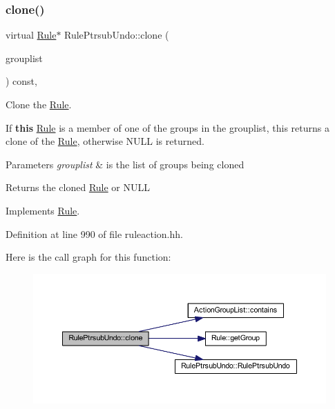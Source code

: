 \subsubsection{\texorpdfstring{clone()}{clone()}}
{\footnotesize\ttfamily virtual \mbox{\hyperlink{class_rule}{Rule}}$\ast$ Rule\+Ptrsub\+Undo\+::clone (\begin{DoxyParamCaption}\item[{const \mbox{\hyperlink{class_action_group_list}{Action\+Group\+List}} \&}]{grouplist }\end{DoxyParamCaption}) const\hspace{0.3cm}{\ttfamily [inline]}, {\ttfamily [virtual]}}



Clone the \mbox{\hyperlink{class_rule}{Rule}}. 

If {\bfseries{this}} \mbox{\hyperlink{class_rule}{Rule}} is a member of one of the groups in the grouplist, this returns a clone of the \mbox{\hyperlink{class_rule}{Rule}}, otherwise N\+U\+LL is returned. 
\begin{DoxyParams}{Parameters}
{\em grouplist} & is the list of groups being cloned \\
\hline
\end{DoxyParams}
\begin{DoxyReturn}{Returns}
the cloned \mbox{\hyperlink{class_rule}{Rule}} or N\+U\+LL 
\end{DoxyReturn}


Implements \mbox{\hyperlink{class_rule_a70de90a76461bfa7ea0b575ce3c11e4d}{Rule}}.



Definition at line 990 of file ruleaction.\+hh.

Here is the call graph for this function\+:
\nopagebreak
\begin{figure}[H]
\begin{center}
\leavevmode
\includegraphics[width=350pt]{class_rule_ptrsub_undo_a43d93ec61cd150a0cadb4752667558b1_cgraph}
\end{center}
\end{figure}
\mbox{\label{class_rule_ptrsub_undo_a2222b84cbf7aa02729820e3defbd818e}} 
